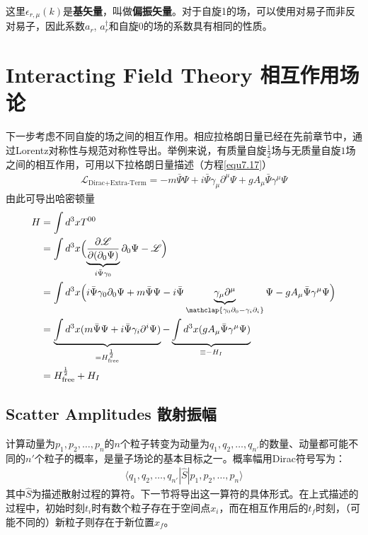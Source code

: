 这里$\epsilon_{r,\mu}(k)$是{\bfseries 基矢量}，叫做{\bfseries 偏振矢量}。对于自旋1的场，可以使用对易子而非反对易子，因此系数$a_{r}$, $a_{r}^{\dagger}$和自旋$0$的场的系数具有相同的性质。

\section[相互作用场论]{Interacting Field Theory \quad 相互作用场论}\label{sec9.5}
下一步考虑不同自旋的场之间的相互作用。相应拉格朗日量已经在先前章节中，通过Lorentz对称性与规范对称性导出。举例来说，有质量自旋$\frac{1}{2}$场与无质量自旋$1$场之间的相互作用，可用以下拉格朗日量描述（方程\eqref{equ7.17}）
\begin{align}\label{equ9.45}
\mathscr{L}_\text{Dirac+Extra-Term}=-m\bar{\Psi}\Psi+i\bar{\Psi}\gamma_\mu\partial^\mu\Psi+gA_\mu\bar{\Psi}\gamma^\mu\Psi
\end{align}
由此可导出哈密顿量
\begin{align}
H&=\int{d^3x T^{00}}\nonumber\\
&=\int{d^3x\Bigl(\underbrace{\frac{\partial\mathscr{L}}{\partial(\partial_0\Psi)} }_{i\bar{\Psi}\gamma_0}\partial_0\Psi-\mathscr{L} \Bigl)}\nonumber\\
&=\int d^3x\Bigl( i\bar{\Psi}\gamma_0\partial_0\Psi+m\bar{\Psi}\Psi-i\bar{\Psi}\underbrace{\gamma_\mu\partial^\mu}_{\mathclap{\gamma_0\partial_0-\gamma_i\partial_i}}\Psi-gA_\mu\bar{\Psi}\gamma^\mu\Psi \Bigl)\nonumber\\
&=\underbrace{\int d^3x( m\bar{\Psi}\Psi+i\bar{\Psi}\gamma_i\partial^i\Psi)}_{=H^{\frac{1}{2}}_\text{free}}- \underbrace{\int d^3x (gA_\mu\bar{\Psi}\gamma^\mu\Psi )}_{\equiv-H_I}\nonumber\\
&=H_\text{free}^{\frac{1}{2}}+H_I \label{equ9.46}
\end{align}

\subsection[散射振幅]{Scatter Amplitudes \quad 散射振幅}\label{sec9.5.1}
计算动量为$p_1,p_2,\ldots,p_n$的$n$个粒子转变为动量为$q_1,q_2,\ldots,q_{n'}$的数量、动量都可能不同的$n'$个粒子的概率，是量子场论的基本目标之一。概率幅用Dirac符号写为：
\begin{align}\label{equ9.47}
\langle q_1,q_2,\ldots,q_{n'}|\hat{S}|p_1,p_2,\ldots,p_n\rangle
\end{align}
其中$\hat{S}$为描述散射过程的算符。下一节将导出这一算符的具体形式。在上式描述的过程中，初始时刻$t_i$时有数个粒子存在于空间点$x_i$，而在相互作用后的$t_f$时刻，（可能不同的）新粒子则存在于新位置$x_f$。

